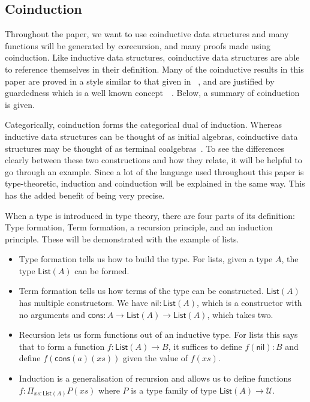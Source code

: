 \documentclass{article}
\theoremstyle{definition}
\theoremstyle{remark}
\begin{document}
\subsection{Coinduction}\label{sec:coinduction}

Throughout the paper, we want to use coinductive data structures and many functions will be generated by corecursion, and many proofs made using coinduction. Like inductive data structures, coinductive data structures are able to reference themselves in their definition. Many of the coinductive results in this paper are proved in a style similar to that given in ~\cite{kozen_silva_2017}, and are justified by guardedness which is a well known concept~\cite{10.1007/3-540-58085-9_72}~\cite{gimenez1995codifying}. Below, a summary of coinduction is given.

Categorically, coinduction forms the categorical dual of induction. Whereas inductive data structures can be thought of as initial algebras, coinductive data structures may be thought of as terminal coalgebras~\cite{jacobs1997tutorial}. To see the differences clearly between these two constructions and how they relate, it will be helpful to go through an example. Since a lot of the language used throughout this paper is type-theoretic, induction and coinduction will be explained in the same way. This has the added benefit of being very precise.

When a type is introduced in type theory, there are four parts of its definition: Type formation, Term formation, a recursion principle, and an induction principle. These will be demonstrated with the example of lists.
\begin{itemize}
\item Type formation tells us how to build the type. For lists, given a type \(A\), the type \(\mathsf{List}(A)\) can be formed.
\item Term formation tells us how terms of the type can be constructed. \(\mathsf{List}(A)\) has multiple constructors. We have \(\mathsf{nil} : \mathsf{List}(A)\), which is a constructor with no arguments and \(\mathsf{cons} : A \to \mathsf{List}(A) \to \mathsf{List}(A)\), which takes two.
\item Recursion lets us form functions out of an inductive type. For lists this says that to form a function \(f : \mathsf{List}(A) \to B\), it suffices to define \(f(\mathsf{nil}) : B\) and define \(f(\mathsf{cons}(a)(xs))\) given the value of \(f(xs)\).
\item Induction is a generalisation of recursion and allows us to define functions \(f : \Pi_{xs : \mathsf{List}(A)} P(xs)\) where \(P\) is a type family of type \(\mathsf{List}(A) \to \mathcal{U}\).
\end{itemize}
\end{document}
